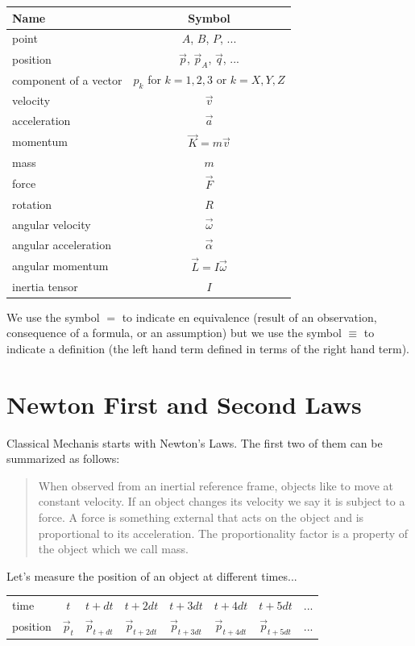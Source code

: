 \documentclass[12pt]{article}
\begin{document}
\begin{tabular}{|l|c|} \hline
Name & Symbol \\ \hline
point & $A$, $B$, $P$, ... \\
position & $\vec p$, $\vec p_A$, $\vec q$, ... \\
component of a vector & $p_k$ for $k=1,2,3$ or $k=X,Y,Z$ \\
velocity & $\vec v$ \\
acceleration & $\vec a$ \\
momentum & $\vec K = m \vec v$ \\
mass & $m$ \\
force & $\vec F$ \\
rotation & $R$ \\
angular velocity & $\vec \omega$ \\
angular acceleration & $\vec \alpha$ \\
angular momentum & $\vec L = I \vec \omega$ \\
inertia tensor & $I$ \\ \hline
\end{tabular}

We use the symbol $=$ to indicate en equivalence (result of an observation, consequence of a formula, or an assumption) but we use the symbol $\equiv$ to indicate a definition (the left hand term defined in terms of the right hand term).

\section{Newton First and Second Laws}

Classical Mechanis starts with Newton's Laws. The first two of them can be summarized as follows:

\begin{quote}
When observed from an inertial reference frame, objects like to move at constant velocity. If an object changes its velocity we say it is subject to a force. A force is something external that acts on the object and is proportional to its acceleration. The proportionality factor is a property of the object which we call mass.
\end{quote}

Let's measure the position of an object at different times...

\begin{center}
\begin{tabular}{lccccccc} \hline
time & $t$ & $t+dt$ & $t+2dt$ & $t+3dt$ & $t+4dt$ & $t+5dt$ & ... \\
position & $\vec p_t$ & $\vec p_{t+dt}$ & $\vec p_{t+2dt}$ & $\vec p_{t+3dt}$ & $\vec p_{t+4dt}$ & $\vec p_{t+5dt}$ & ... \\ \hline
\end{tabular}
\end{center}
\end{document}
